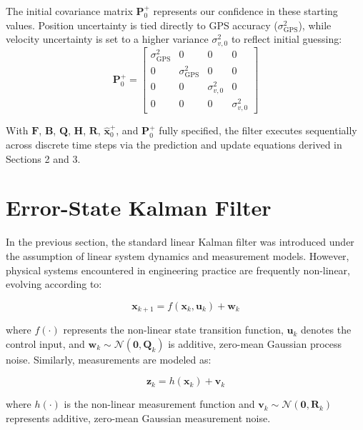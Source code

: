 \documentclass{article}
\begin{document}
	The initial covariance matrix $\mathbf{P}_0^+$ represents our confidence in these starting values. Position uncertainty is tied directly to GPS accuracy ($\sigma_{\text{GPS}}^2$), while velocity uncertainty is set to a higher variance $\sigma_{v,0}^2$ to reflect initial guessing:
	\begin{equation}
		\mathbf{P}_0^+ = 
		\begin{bmatrix}
			\sigma_{\text{GPS}}^2 & 0 & 0 & 0 \\
			0 & \sigma_{\text{GPS}}^2 & 0 & 0 \\
			0 & 0 & \sigma_{v,0}^2 & 0 \\
			0 & 0 & 0 & \sigma_{v,0}^2
		\end{bmatrix}
	\end{equation}
	
	With $\mathbf{F}$, $\mathbf{B}$, $\mathbf{Q}$, $\mathbf{H}$, $\mathbf{R}$, $\hat{\mathbf{x}}_0^+$, and $\mathbf{P}_0^+$ fully specified, the filter executes sequentially across discrete time steps via the prediction and update equations derived in Sections 2 and 3.
	
	\section{Error-State Kalman Filter}
	
	In the previous section, the standard linear Kalman filter was introduced under the assumption of linear system dynamics and measurement models. However, physical systems encountered in engineering practice are frequently non-linear, evolving according to:
	
	\begin{equation}
		\mathbf{x}_{k+1} = f(\mathbf{x}_k, \mathbf{u}_k) + \mathbf{w}_k
	\end{equation}
	
	where $f(\cdot)$ represents the non-linear state transition function, $\mathbf{u}_k$ denotes the control input, and $\mathbf{w}_k \sim \mathcal{N}(\mathbf{0}, \mathbf{Q}_k)$ is additive, zero-mean Gaussian process noise. Similarly, measurements are modeled as:
	
	\begin{equation}
		\mathbf{z}_k = h(\mathbf{x}_k) + \mathbf{v}_k
	\end{equation}
	
	where $h(\cdot)$ is the non-linear measurement function and $\mathbf{v}_k \sim \mathcal{N}(\mathbf{0}, \mathbf{R}_k)$ represents additive, zero-mean Gaussian measurement noise.
	
\end{document}
